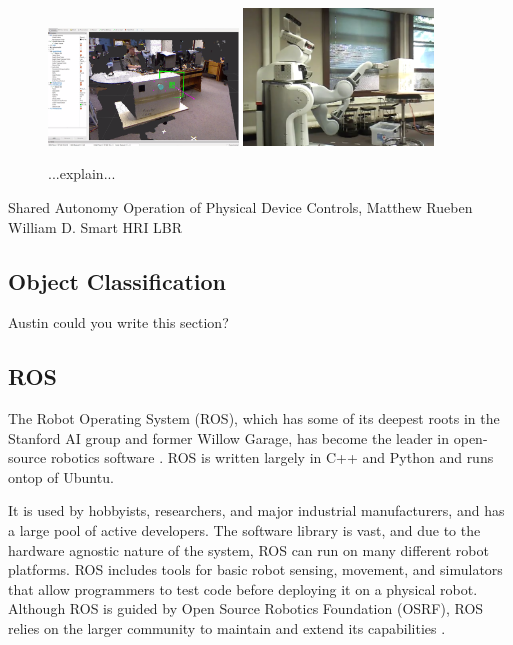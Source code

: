 \documentclass{article}
\begin{document}
\begin{figure}[h!]
    \centering
    \includegraphics[width=0.45\textwidth]{Shared_Autonomy_1.png}
    \includegraphics[width=0.45\textwidth]{Shared_Autonomy_2.png}
    \caption{...explain...}
    \label{fig:sharedAutonomy}
\end{figure}
Shared Autonomy Operation of Physical Device Controls, Matthew Rueben William D. Smart HRI LBR

\subsection{Object Classification}
Austin could you write this section?

\subsection{ROS}
The Robot Operating System (ROS), which has some of its deepest roots in the Stanford AI group and former Willow Garage, 
has become the leader in open-source robotics software \cite{ros, rospaper}. ROS is written largely in C++ and Python and runs ontop of Ubuntu.  

It is used by hobbyists, researchers, and major industrial manufacturers, and has a large pool of active developers. The software library is vast, and due to the hardware agnostic nature of the system, ROS can run on many different robot platforms.  ROS includes tools for basic robot sensing, movement, and simulators that allow programmers to test code before deploying it on a physical robot. Although ROS is guided by Open Source Robotics Foundation (OSRF), ROS relies on the larger community to maintain and extend its capabilities \cite{ros, OSRF}.
\end{document}
